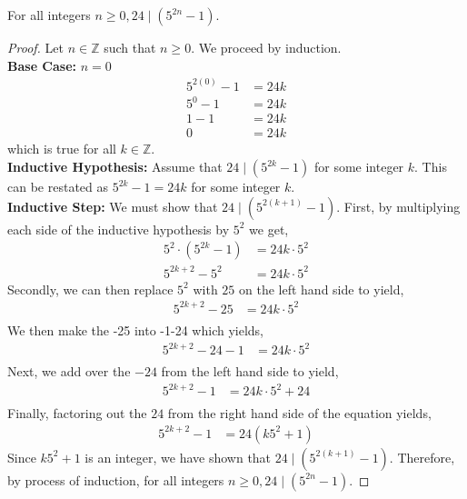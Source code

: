 \documentclass[12pt]{article}
\newenvironment{theorem}[2][Theorem]{\begin{trivlist}
\item[\hskip \labelsep {\bfseries #1}\hskip \labelsep {\bfseries #2.}]}{\end{trivlist}}
\begin{document}
\section{}
	
\begin{theorem}{5}
	For all integers $n \geq 0, 24\mid(5^{2n}-1)$.
\end{theorem}
\begin{proof}
	Let $n \in \mathbb{Z}$ such that $n \geq 0$. We proceed by induction.\\
	\textbf{Base Case:} $n = 0$\\
	\begin{align*}
		5^{2(0)}-1 &= 24k\\
		5^{0}-1 &= 24k\\
		1-1 &= 24k\\
		0 &= 24k
	\end{align*}
	which is true for all $k \in \mathbb{Z}$.\\
	\textbf{Inductive Hypothesis:} Assume that $24\mid(5^{2k}-1)$ for some integer $k$.
	This can be restated as $5^{2k}-1=24k$ for some integer $k$.\\
	\textbf{Inductive Step:} We must show that $24\mid(5^{2(k+1)}-1)$.
	First, by multiplying each side of the inductive hypothesis by $5^{2}$ we get,
	\begin{align*}
		5^{2}\cdot(5^{2k}-1) &= 24k\cdot5^{2}\\
		5^{2k+2}-5^{2} &= 24k\cdot5^{2}
	\end{align*}
	Secondly, we can then replace $5^{2}$ with $25$ on the left hand side to yield,
	\begin{align*}
		5^{2k+2}-25  &= 24k\cdot5^2\\
	\end{align*}
	We then make the -25 into -1-24 which yields,
	\begin{align*}
		5^{2k+2}-24-1  &= 24k\cdot5^2\\
	\end{align*}
	Next, we add over the $-24$ from the left hand side to yield,
	\begin{align*}
		5^{2k+2}-1 &= 24k\cdot5^2+24\\
	\end{align*}
	Finally, factoring out the $24$ from the right hand side of the equation yields,
	\begin{align*}
		5^{2k+2}-1 &= 24(k5^2+1)
	\end{align*}
	Since $k5^2+1$ is an integer, we have shown that $24\mid(5^{2(k+1)}-1)$.
	Therefore, by process of induction, for all integers $n \geq 0, 24\mid(5^{2n}-1)$.
\end{proof}
\end{document}
